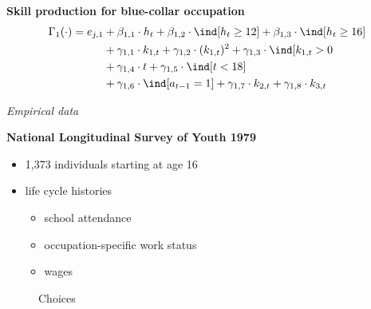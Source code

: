 \begin{frame}\textbf{Skill production for blue-collar occupation}\vspace{0.3cm}
%
\begin{align*}\label{Skill production function}
    \Gamma_1(\cdot) = e_{j,1} & + \beta_{1,1} \cdot h_t + \beta_{1, 2} \cdot \ind[h_t \geq 12] + \beta_{1,3} \cdot \ind[h_t\geq 16]\\
                                  & + \gamma_{1, 1} \cdot  k_{1,t} + \gamma_{1,2} \cdot  (k_{1,t})^2 + \gamma_{1,3} \cdot  \ind[k_{1,t} > 0 \\
                                & + \gamma_{1,4} \cdot  t + \gamma_{1,5} \cdot \ind[t < 18]\\
                                  & + \gamma_{1,6} \cdot \ind[a_{t-1} = 1] + \gamma_{1,7} \cdot  k_{2,t} + \gamma_{1,8} \cdot  k_{3,t}
\end{align*}

\end{frame}
\begin{frame}\begin{center}
		\LARGE\textit{Empirical data}
\end{center}\end{frame}
\begin{frame}\textbf{National Longitudinal Survey of Youth 1979}\vspace{0.3cm}

\begin{itemize}\setlength\itemsep{1em}
\item 1,373 individuals starting at age 16
\item life cycle histories \medskip
\begin{itemize}\setlength\itemsep{1em}
\item school attendance
\item occupation-specific work status
\item wages
\end{itemize}
\end{itemize}
\end{frame}
\begin{frame}
  \begin{figure}
  \caption{Choices}
  \end{figure}
\end{frame}

